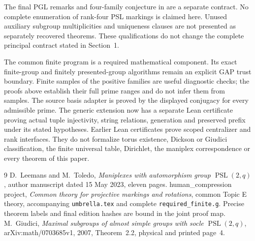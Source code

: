 \documentclass[11pt]{article}
\begin{document}
The final PGL remarks and four-family conjecture in \cite[Section~5]{LT}
are a separate contract. No complete enumeration of rank-four PSL
markings is claimed here. Unused auxiliary subgroup multiplicities and
uniqueness clauses are not presented as separately recovered theorems.
These qualifications do not change the complete principal contract
stated in Section~1.

The common finite program is a required mathematical component. Its
exact finite-group and finitely presented-group algorithms remain an
explicit GAP trust boundary. Finite samples of the positive families
are useful diagnostic checks; the proofs above establish their full
prime ranges and do not infer them from samples. The source basis
adapter is proved by the displayed conjugacy for every admissible prime.
The generic extension now has a separate Lean certificate proving
actual tuple injectivity, string relations, generation and preserved
prefix under its stated hypotheses. Earlier Lean certificates prove
scoped centralizer and rank interfaces. They do not formalize torus
existence, Dickson or Giudici classification, the finite universal table,
Dirichlet, the maniplex correspondence or every theorem of this paper.

\begin{thebibliography}{9}
 D.~Leemans and M.~Toledo,
\emph{Maniplexes with automorphism group $\operatorname{PSL}(2,q)$},
author manuscript dated 15 May 2023, eleven pages.
 human\_compression project,
\emph{Common theory for projective markings and rotations},
common Topic E theory, accompanying \texttt{umbrella.tex} and complete
\texttt{required\_finite.g}. Precise theorem labels and final edition
hashes are bound in the joint proof map.
 M.~Giudici,
\emph{Maximal subgroups of almost simple groups with socle
$\operatorname{PSL}(2,q)$}, arXiv:math/0703685v1, 2007,
Theorem~2.2, physical and printed page~4.
\end{thebibliography}
\end{document}

